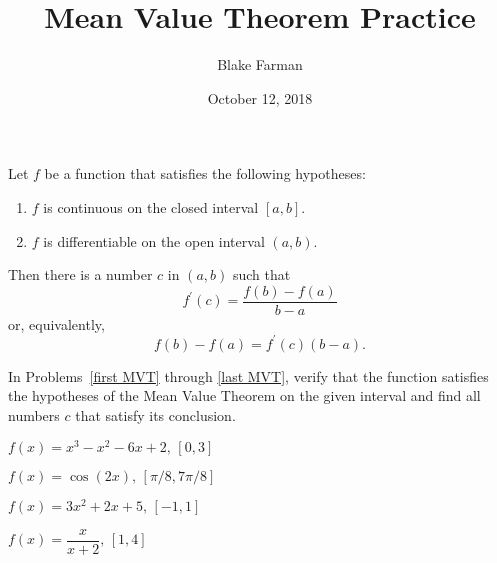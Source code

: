 \documentclass[10pt]{amsart}
\title[Mean Value Theorem]{Mean Value Theorem Practice}
\date{October 12, 2018}
\author{Blake Farman}
\begin{document}
\maketitle

\makenameslot

\begin{thm*}
  Let \(f\) be a function that satisfies the following hypotheses:
  \begin{enumerate}
  \item
    \(f\) is continuous on the closed interval \([a,b]\).
  \item
    \(f\) is differentiable on the open interval \((a,b)\).
  \end{enumerate}
  Then there is a number \(c\) in \((a,b)\) such that
  \[f^\prime(c) = \frac{f(b) - f(a)}{b - a}\]
  or, equivalently,
  \[f(b) - f(a) = f^\prime(c)(b - a).\]
\end{thm*}

In Problems~\ref{first MVT} through \ref{last MVT}, verify that the function satisfies the hypotheses of the Mean Value Theorem on the given interval and find all numbers \(c\) that satisfy its conclusion.
\begin{thm}\label{first MVT}
  \(f(x) = x^3 - x^2 - 6x + 2,\, [0,3]\)
\end{thm}

\vspace{1.5in}

\begin{thm}
  \(f(x) = \cos(2x),\, [\pi/8, 7\pi/8]\)
\end{thm}

\newpage

\begin{thm}
    \(f(x) = 3x^2 + 2x + 5,\, [-1,1]\)
\end{thm}
\vspace{1.5in}
\begin{thm}\label{last MVT}
  \(f(x) = \dfrac{x}{x + 2},\, [1,4]\)
\end{thm}
\end{document}
